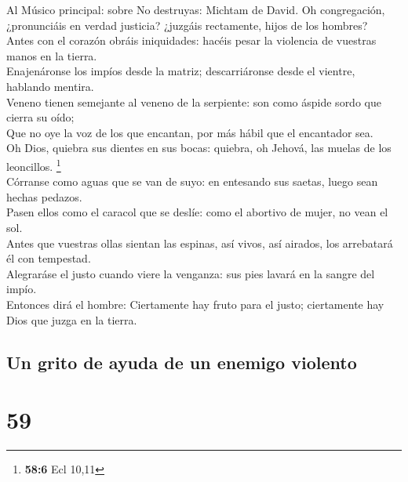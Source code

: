  Al Músico principal: sobre No destruyas: Michtam de David.
Oh congregación, ¿pronunciáis en verdad justicia? ¿juzgáis rectamente,
hijos de los hombres?\\
 Antes con el corazón obráis iniquidades: hacéis pesar la
violencia de vuestras manos en la tierra.\\
 Enajenáronse los impíos desde la matriz; descarriáronse
desde el vientre, hablando mentira.\\
 Veneno tienen semejante al veneno de la serpiente: son como
áspide sordo que cierra su oído;\\
 Que no oye la voz de los que encantan, por más hábil que el
encantador sea.\\
 Oh Dios, quiebra sus dientes en sus bocas: quiebra, oh
Jehová, las muelas de los leoncillos. \footnote{\textbf{58:6} Ecl 10,11}\\
 Córranse como aguas que se van de suyo: en entesando sus
saetas, luego sean hechas pedazos.\\
 Pasen ellos como el caracol que se deslíe: como el abortivo
de mujer, no vean el sol.\\
 Antes que vuestras ollas sientan las espinas, así vivos,
así airados, los arrebatará él con tempestad.\\
 Alegraráse el justo cuando viere la venganza: sus pies
lavará en la sangre del impío.\\
 Entonces dirá el hombre: Ciertamente hay fruto para el
justo; ciertamente hay Dios que juzga en la tierra.

\hypertarget{un-grito-de-ayuda-de-un-enemigo-violento}{%
\subsection{Un grito de ayuda de un enemigo
violento}\label{un-grito-de-ayuda-de-un-enemigo-violento}}

\hypertarget{section-58}{%
\section{59}\label{section-58}}

